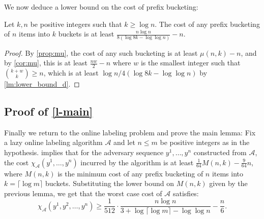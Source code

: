\documentclass[unicode,review]{siamart1116}
\newcommand{\A}{\mathcal{A}}
\numberwithin{theorem}{section}
\begin{document}
We  now deduce a lower bound on the cost of prefix bucketing:
\begin{lemma}\label{l-lbb}
Let $k,n$ be positive integers such that $k \ge \log n$.
The cost of any prefix bucketing of $n$ items into $k$ buckets is at least $\frac{n \log n}{8 (\log 8k - \log \log n)} - n$.
\end{lemma}

\begin{proof}
By \cref{prop:mu}, the cost of any such bucketing is at least $\mu(n,k)-n$, and by \cref{cor:mu},
this is at least $\frac{nw}{2}-n$ where $w$ is the smallest integer such that $\binom{k+w}{k} \geq n$, which is at
least $\log n/4(\log 8k -\log\log n)$ by \cref{lm:lower_bound_d}.
\end{proof}

\iffalse
\begin{proof}
For $n=1$ the lemma is straightforward so let us assume $n \ge 2$.
Consider a prefix bucketing $\bar{a} = a^0,a^1,\dotsc,a^n$ of $n$ items into $k$ buckets.
Let $b = (n,0,0,\dotsc,0)$ be a $k$-tuple of integers,
and let  $\bar{b} = a^0,a^1,\dotsc,a^{n-1},b$.
Clearly, $\bar{b}$ is also a prefix bucketing and $c(\bar{b}) \le c(\bar{a}) + n-1$. 
Hence, it suffices to show that $c(\bar{b}) > \frac{n \log n}{8 (\log 8k - \log \log n)}$.

Let $T$ be $T(\bar{b})_1$.
By \cref{p-ts}, $|T|=n$, and by \cref{p-ta}, $T$ is $k$-admissible.
Furthermore, by \cref{l-tc}, $c(\bar{b}) = \sum_{i=1}^k c(T(\bar{b})_i) = c(T)$,
so we only need to bound $c(T)$ from below.
From \cref{lm:balanced} it follows that
there is a balanced $k$-admissible tree $T'$ of size $n$ such that $c(T) \geq c(T')$.

Let the depth of $T'$ be $d$.
By \cref{lm:k-d-size}, $T'$ has at most $\binom{k + d-1}{k}$ nodes.
Using \cref{lm:lower_bound_d}, we see that
$d > \frac{\log n}{4 (\log 8k - \log \log n)}$; otherwise, $T'$ could not contain $n$ nodes.
Since $T'$ is balanced, by \cref{lm:k-d-cost}, $c(T') \ge \frac{(d-1)+1}{2} \cdot n = \frac{dn}{2}$.
Thus, $c(T) \ge c(T') > \frac{n \log n}{8 (\log 8k - \log \log n)}$. The lemma follows.
\end{proof}
\fi


\subsection{Proof of \texorpdfstring{\cref{l-main}}{}}\label{ss-main}
Finally we return to the online labeling problem and prove the main lemma:
Fix a lazy online labeling algorithm $\A$ and let $n \leq m$ be positive integers as in the hypothesis.
 implies that for the adversary sequence $y^1,\ldots,y^n$ constructed from $\A$, 
the cost $\chi_{\A}(y^1,\ldots,y^n)$ incurred by the algorithm is at least
$ \frac{1}{64} M(n,k) - \frac{9}{64} n$, where $M(n,k)$ is the minimum cost of
any prefix bucketing of $n$ items into  $k=\lceil \log m \rceil$ buckets.  
Substituting the lower bound on $M(n,k)$ given by the previous lemma, we get that
the worst case cost of $\A$ satisfies:
$$\chi_\A(y^1,y^2,\dotsc,y^n) \ge \frac{1}{512} \cdot \frac{n \log n}{ 3 + \log \lceil \log m \rceil - \log \log n} - \frac{n}{6}.$$
\end{document}
